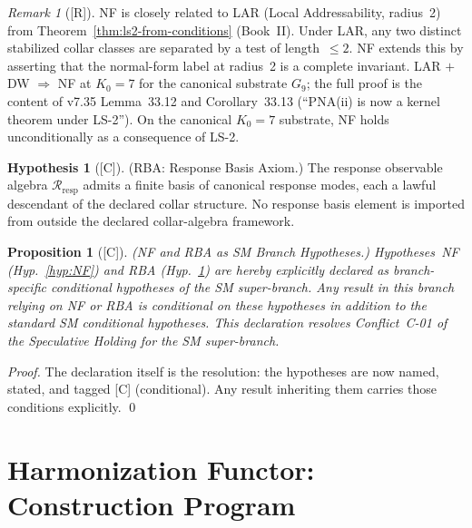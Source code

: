 \documentclass[12pt,oneside]{amsbook}
\theoremstyle{plain}
\newtheorem{proposition}[theorem]{Proposition}
\theoremstyle{definition}
\newtheorem{hypothesis}[theorem]{Hypothesis}
\theoremstyle{remark}
\newtheorem{remark}[theorem]{Remark}
\newcommand{\status}[1]{\textup{[#1]}}
\begin{document}
\begin{remark}[\status{R}]
NF is closely related to LAR (Local Addressability, radius~2)
from Theorem~\ref{thm:ls2-from-conditions} (Book~II). Under
LAR, any two distinct stabilized collar classes are separated
by a test of length~$\leq 2$. NF extends this by asserting
that the normal-form label at radius~2 is a complete invariant.
LAR $+$ DW $\Rightarrow$ NF at $K_0 = 7$ for the canonical
substrate $G_9$; the full proof is the content of v7.35
Lemma~33.12 and Corollary~33.13 (``PNA(ii) is now a kernel
theorem under LS-2''). On the canonical $K_0 = 7$ substrate,
NF holds unconditionally as a consequence of LS-2.
\end{remark}

\begin{hypothesis}[\status{C}]\label{hyp:RBA}
\textup{(RBA: Response Basis Axiom.)}
The response observable algebra $\mathcal{R}_{\mathrm{resp}}$
admits a finite basis of canonical response modes, each a lawful
descendant of the declared collar structure. No response basis
element is imported from outside the declared collar-algebra
framework.
\end{hypothesis}

\begin{proposition}[\status{C}]\label{prop:NF-RBA-declared}
\textup{(NF and RBA as SM Branch Hypotheses.)}
Hypotheses~NF (Hyp.~\ref{hyp:NF}) and RBA (Hyp.~\ref{hyp:RBA})
are hereby explicitly declared as branch-specific conditional
hypotheses of the SM super-branch. Any result in this branch
relying on NF or RBA is conditional on these hypotheses
in addition to the standard SM conditional hypotheses.
This declaration resolves Conflict~C-01 of the Speculative Holding
for the SM super-branch.
\end{proposition}

\begin{proof}
The declaration itself is the resolution: the hypotheses are now
named, stated, and tagged [C] (conditional). Any result
inheriting them carries those conditions explicitly. \qed
\end{proof}

\section{Harmonization Functor: Construction Program}
\label{sec:sm-harmonization-program}
\end{document}
